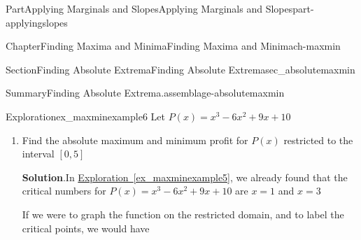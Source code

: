 \documentclass[oneside,10pt,]{tufte-book}
\newcommand{\blocktitlefont}{\relax}
\newcommand{\xreffont}{\relax}
\numberwithin{equation}{chapter}
\begin{document}
\begin{partptx}{Part}{Applying Marginals and Slopes}{}{Applying Marginals and Slopes}{}{}{part-applyingslopes}
\begin{chapterptx}{Chapter}{Finding Maxima and Minima}{}{Finding Maxima and Minima}{}{}{ch-maxmin}
\begin{sectionptx}{Section}{Finding Absolute Extrema}{}{Finding Absolute Extrema}{}{}{sec_absolutemaxmin}
\begin{assemblage}{Summary}{Finding Absolute Extrema.}{assemblage-absolutemaxmin}
\end{assemblage}
\begin{exploration}{Exploration}{}{ex_maxminexample6}%
Let \(P(x)  = x^3 - 6x^2  + 9x + 10\)%
\begin{enumerate}[font=\bfseries,label=(\alph*),ref=\alph*]%
\item{}Find the absolute maximum and minimum profit for  \(P(x)\) restricted to the interval \([0,5]\)%
\par\smallskip%
\noindent\textbf{\blocktitlefont Solution}.\hypertarget{ex_maxminexample6-2-2}{}\quad{}In \hyperref[ex_maxminexample5]{Exploration~{\xreffont\ref{ex_maxminexample5}}}, we already found that the critical numbers for \(P(x)  = x^3 - 6x^2  + 9x + 10\) are \(x=1\) and \(x=3\)%
\par
If we were to graph the function on the restricted domain, and to label the critical points, we would have \begin{image}{0.25}{0.5}{0.25}{}%
\end{image}
\end{enumerate}
\end{exploration}
\end{sectionptx}
\end{chapterptx}
\end{partptx}
\end{document}
